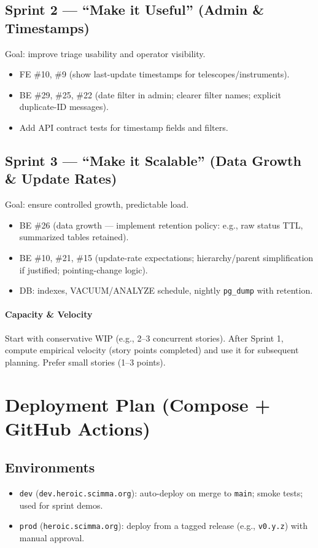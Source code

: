 \documentclass[11pt]{article}
\begin{document}
\subsection*{Sprint 2 --- ``Make it Useful'' (Admin \& Timestamps)}
Goal: improve triage usability and operator visibility.
\begin{itemize}[leftmargin=1.2em]
  \item FE \#10, \#9 (show last-update timestamps for telescopes/instruments).
  \item BE \#29, \#25, \#22 (date filter in admin; clearer filter names; explicit duplicate-ID messages).
  \item Add API contract tests for timestamp fields and filters.
\end{itemize}

\subsection*{Sprint 3 --- ``Make it Scalable'' (Data Growth \& Update Rates)}
Goal: ensure controlled growth, predictable load.
\begin{itemize}[leftmargin=1.2em]
  \item BE \#26 (data growth --- implement retention policy: e.g., raw status TTL, summarized tables retained).
  \item BE \#10, \#21, \#15 (update-rate expectations; hierarchy/parent simplification if justified; pointing-change logic).
  \item DB: indexes, VACUUM/ANALYZE schedule, nightly \texttt{pg\_dump} with retention.
\end{itemize}

\paragraph{Capacity \& Velocity} Start with conservative WIP (e.g., 2--3 concurrent stories). After Sprint 1, compute empirical velocity (story points completed) and use it for subsequent planning. Prefer small stories (1--3 points).

\section{Deployment Plan (Compose + GitHub Actions)}
\subsection*{Environments}
\begin{itemize}[leftmargin=1.2em]
  \item \texttt{dev} (\texttt{dev.heroic.scimma.org}): auto-deploy on merge to \texttt{main}; smoke tests; used for sprint demos.
  \item \texttt{prod} (\texttt{heroic.scimma.org}): deploy from a tagged release (e.g., \texttt{v0.y.z}) with manual approval.
\end{itemize}
\end{document}

